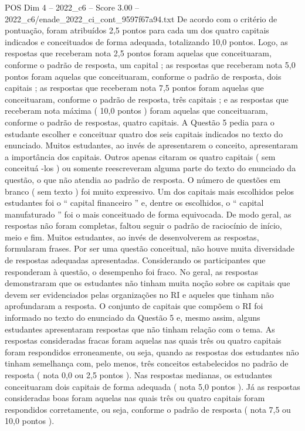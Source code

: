 \begin{textsample}{POS Dim 4 – 2022\_c6 – Score 3.00 – 2022\_c6/enade\_2022\_ci\_cont\_9597f67a94.txt}
De acordo com o critério de pontuação, foram atribuídos 2,5 pontos para cada um dos quatro capitais indicados e conceituados de forma adequada, totalizando 10,0 pontos.
Logo, as respostas que receberam nota 2,5 pontos foram aquelas que conceituaram, conforme o padrão de resposta, um capital ; as respostas que receberam nota 5,0 pontos foram aquelas que conceituaram, conforme o padrão de resposta, dois capitais ; as respostas que receberam nota 7,5 pontos foram aquelas que conceituaram, conforme o padrão de resposta, três capitais ; e as respostas que receberam nota máxima ( 10,0 pontos ) foram aquelas que conceituaram, conforme o padrão de respostas, quatro capitais.
A Questão 5 pedia para o estudante escolher e conceituar quatro dos seis capitais indicados no texto do enunciado.
Muitos estudantes, ao invés de apresentarem o conceito, apresentaram a importância dos capitais.
Outros apenas citaram os quatro capitais ( sem conceituá -los ) ou somente reescreveram alguma parte do texto do enunciado da questão, o que não atendia ao padrão de resposta.
O número de questões em branco ( sem texto ) foi muito expressivo.
Um dos capitais mais escolhidos pelos estudantes foi o “ capital financeiro ” e, dentre os escolhidos, o “ capital manufaturado ” foi o mais conceituado de forma equivocada.
De modo geral, as respostas não foram completas, faltou seguir o padrão de raciocínio de início, meio e fim.
Muitos estudantes, ao invés de desenvolverem as respostas, formularam frases.
Por ser uma questão conceitual, não houve muita diversidade de respostas adequadas apresentadas.
Considerando os participantes que responderam à questão, o desempenho foi fraco.
No geral, as respostas demonstraram que os estudantes não tinham muita noção sobre os capitais que devem ser evidenciados pelas organizações no RI e aqueles que tinham não aprofundaram a resposta.
O conjunto de capitais que compõem o RI foi informado no texto do enunciado da Questão 5 e, mesmo assim, alguns estudantes apresentaram respostas que não tinham relação com o tema.
As respostas consideradas fracas foram aquelas nas quais três ou quatro capitais foram respondidos erroneamente, ou seja, quando as respostas dos estudantes não tinham semelhança com, pelo menos, três conceitos estabelecidos no padrão de resposta ( nota 0,0 ou 2,5 pontos ).
Nas respostas medianas, os estudantes conceituaram dois capitais de forma adequada ( nota 5,0 pontos ).
Já as respostas consideradas boas foram aquelas nas quais três ou quatro capitais foram respondidos corretamente, ou seja, conforme o padrão de resposta ( nota 7,5 ou 10,0 pontos ).

\end{textsample}
